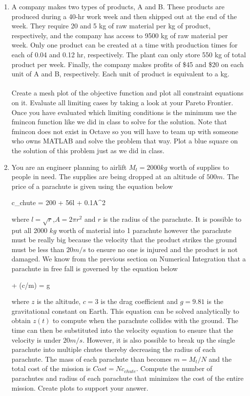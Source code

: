 \begin{enumerate}
\item A company makes two types of products, A and B. These products
  are produced during a 40-hr work week and then shipped out at the
  end of the week. They require 20 and 5 kg of raw material per kg of
  product, respectively, and the company has access to 9500 kg of raw
  material per week. Only one product can be created at a time with
  production times for each of 0.04 and 0.12 hr, respectively. The
  plant can only store 550 kg of total product per week. Finally, the
  company makes profits of \$45 and \$20 on each unit of A and B,
  respectively. Each unit of product is equivalent to a kg.\\
  \ \\
  Create a mesh plot of the objective function and plot all constraint
  equations on it. Evaluate all 
  limiting cases by taking a look at your Pareto Frontier. Once you
  have evaluated which limiting conditions is the minimum use the
  fmincon function like we did in class to solve for the
  solution. Note that fmincon does not exist in Octave so you will
  have to team up with someone who owns MATLAB and solve the problem
  that way. Plot a blue square on the solution of this problem just as
  we did in class. 

\item You are an engineer planning to airlift $M_t = 2000 kg$ worth of supplies
  to people in need. The supplies are being dropped at an altitude of
  $500 m$. The price of a parachute is given using the equation below

  \beq
  c_{chute} = 200 + 56l + 0.1A^2
  \eeq
  
  where $l=\sqrt{r}$,$A=2\pi r^2$ and $r$ is the radius of the
  parachute. It is possible to put all 2000 $kg$ worth of material
  into 1 parachute however the parachute must be really big because
  the velocity that the product strikes the ground must be less than
  $20 m/s$ to ensure no one is injured and the product is not
  damaged. We know from the previous section on Numerical Integration
  that a parachute in free fall is governed by the equation below

  \beq
   + (c/m) = g
  \eeq

  where $z$ is the altitude, $c=3$ is the drag coefficient and
  $g=9.81$ is the gravitational constant on Earth. This equation can
  be solved analytically to obtain $z(t)$ to compute when the
  parachute collides with the ground. The time can then be substituted
  into the velocity equation to ensure that the velocity is under $20
  m/s$. However, it is also possible to break up the single parachute
  into multiple chutes thereby decreasing the radius of each
  parachute. The mass of each parachute than becomes $m=M_t/N$ and the
  total cost of the mission is $Cost=Nc_{chute}$. Compute the number
  of parachutes and radius of each parachute that minimizes the cost
  of the entire mission. Create plots to support your answer.


\end{enumerate}
